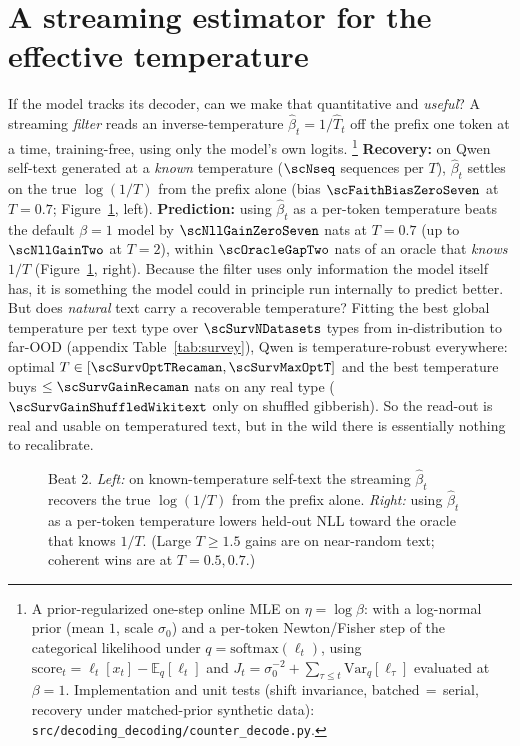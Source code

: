 \documentclass[11pt]{article}
\begin{document}
\section{A streaming estimator for the effective temperature}\label{sec:filter}
If the model tracks its decoder, can we make that quantitative and \emph{useful}?
A streaming \emph{filter} reads an inverse-temperature $\hat\beta_t = 1/\hat T_t$
off the prefix one token at a time, training-free, using only the model's own
logits.%
\footnote{A prior-regularized one-step online MLE on $\eta=\log\beta$: with a
log-normal prior (mean $1$, scale $\sigma_0$) and a per-token Newton/Fisher step
of the categorical likelihood under $q=\mathrm{softmax}(\ell_t)$, using
$\mathrm{score}_t=\ell_t[x_t]-\mathbb{E}_q[\ell_t]$ and
$J_t=\sigma_0^{-2}+\sum_{\tau\le t}\mathrm{Var}_q[\ell_\tau]$ evaluated at
$\beta{=}1$. Implementation and unit tests (shift invariance,
batched\,$=$\,serial, recovery under matched-prior synthetic data):
\texttt{src/decoding\_decoding/counter\_decode.py}.}
\textbf{Recovery:} on Qwen self-text generated at a \emph{known} temperature
($\scNseq$ sequences per $T$), $\hat\beta_t$ settles on the true $\log(1/T)$ from
the prefix alone (bias $\scFaithBiasZeroSeven$ at $T{=}0.7$;
Figure~\ref{fig:selfcal}, left).
\textbf{Prediction:} using $\hat\beta_t$ as a per-token temperature beats the
default $\beta{=}1$ model by $\scNllGainZeroSeven$ nats at $T{=}0.7$ (up to
$\scNllGainTwo$ at $T{=}2$), within $\scOracleGapTwo$ nats of an oracle that
\emph{knows} $1/T$ (Figure~\ref{fig:selfcal}, right).
Because the filter uses only information the model itself has, it is something the
model could in principle run internally to predict better.
But does \emph{natural} text carry a recoverable temperature? Fitting the best
global temperature per text type over $\scSurvNDatasets$ types from
in-distribution to far-OOD (appendix Table~\ref{tab:survey}), Qwen is
temperature-robust everywhere: optimal $T\in[\scSurvOptTRecaman,\scSurvMaxOptT]$
and the best temperature buys $\le\scSurvGainRecaman$ nats on any real type
($\scSurvGainShuffledWikitext$ only on shuffled gibberish).
So the read-out is real and usable on temperatured text, but in the wild there is
essentially nothing to recalibrate.

\begin{figure}[t]
\centering
\begin{minipage}{0.49\linewidth}\centering
  \phantom{X}%
\end{minipage}\hfill
\begin{minipage}{0.49\linewidth}\centering
  \phantom{X}%
\end{minipage}
\caption{Beat 2. \emph{Left:} on known-temperature self-text the streaming
$\hat\beta_t$ recovers the true $\log(1/T)$ from the prefix alone. \emph{Right:}
using $\hat\beta_t$ as a per-token temperature lowers held-out NLL toward the
oracle that knows $1/T$. (Large $T\!\ge\!1.5$ gains are on near-random text;
coherent wins are at $T{=}0.5,0.7$.)}
\label{fig:selfcal}
\end{figure}
\end{document}
